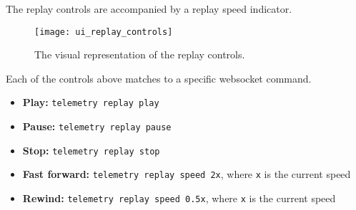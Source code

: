 The replay controls are accompanied by a replay speed indicator.

\begin{figure}[ht]
\centering
\texttt{[image: ui\_replay\_controls]}
\caption{The visual representation of the replay controls.}
\label{fig:Replay Controls}
\end{figure}

Each of the controls above matches to a specific websocket command.

\begin{itemize}
    \item \textbf{Play:} \verb|telemetry replay play|
    \item \textbf{Pause:} \verb|telemetry replay pause|
    \item \textbf{Stop:} \verb|telemetry replay stop|
    \item \textbf{Fast forward:} \verb|telemetry replay speed 2x|, where \verb|x| is the current speed
    \item \textbf{Rewind:} \verb|telemetry replay speed 0.5x|, where \verb|x| is the current speed
\end{itemize}
